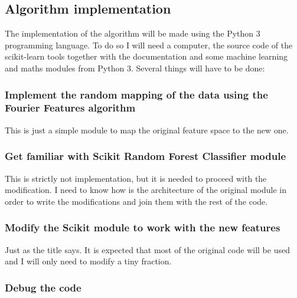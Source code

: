 \documentclass[a4paper]{article}
\begin{document}
        \subsection{Algorithm implementation}

        The implementation of the algorithm will be made using the Python 3 programming language. To do so I will need a computer, the source code of the scikit-learn tools together with the documentation and some machine learning and maths modules from Python 3. Several things will have to be done:

        \subsubsection{Implement the random mapping of the data using the Fourier Features algorithm}

        This is just a simple module to map the original feature space to the new one.

        \subsubsection{Get familiar with Scikit Random Forest Classifier module}

        This is strictly not implementation, but it is needed to proceed with the modification. I need to know how is the architecture of the original module in order to write the modifications and join them with the rest of the code.

        \subsubsection{Modify the Scikit module to work with the new features}

        Just as the title says. It is expected that most of the original code will be used and I will only need to modify a tiny fraction.

        \subsubsection{Debug the code}
\end{document}
